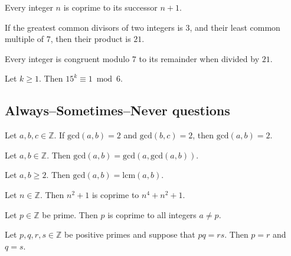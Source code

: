 \begin{chapex} %
Every integer $n$ is coprime to its successor $n+1$.
\end{chapex}

\begin{chapex} %
If the greatest common divisors of two integers is $3$, and their least common multiple of $7$, then their product is $21$.
\end{chapex}

\begin{chapex} %
Every integer is congruent modulo $7$ to its remainder when divided by $21$.
\end{chapex}

\begin{chapex} %
\label{cqNumberTheoryTFEnd}
Let $k \ge 1$. Then $15^k \equiv 1 \bmod 6$.
\end{chapex}

\subsection*{Always--Sometimes--Never questions}


\begin{chapex} %
\label{cqNumberTheoryASNBegin}
Let $a,b,c \in \mathbb{Z}$. If $\mathrm{gcd}(a,b) = 2$ and $\mathrm{gcd}(b,c) = 2$, then $\mathrm{gcd}(a,b) = 2$.
\end{chapex}

\begin{chapex} %
Let $a,b \in \mathbb{Z}$. Then $\mathrm{gcd}(a,b) = \mathrm{gcd}(a,\mathrm{gcd}(a,b))$.
\end{chapex}

\begin{chapex} %
Let $a,b \ge 2$. Then $\mathrm{gcd}(a,b) = \mathrm{lcm}(a,b)$.
\end{chapex}

\begin{chapex} %
Let $n \in \mathbb{Z}$. Then $n^2+1$ is coprime to $n^4+n^2+1$.
\end{chapex}

\begin{chapex} %
Let $p \in \mathbb{Z}$ be prime. Then $p$ is coprime to all integers $a \ne p$.
\end{chapex}

\begin{chapex} %
Let $p,q,r,s \in \mathbb{Z}$ be positive primes and suppose that $pq=rs$. Then $p=r$ and $q=s$.
\end{chapex}

